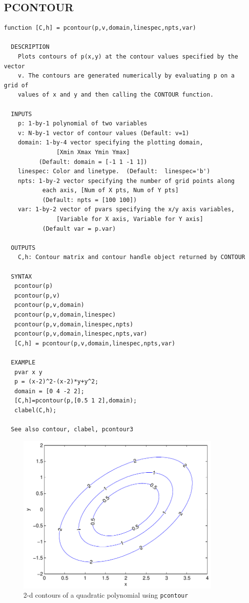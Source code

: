 \documentclass{article}
\begin{document}
\subsection{PCONTOUR}
\begin{verbatim}
function [C,h] = pcontour(p,v,domain,linespec,npts,var)

  DESCRIPTION
    Plots contours of p(x,y) at the contour values specified by the vector
    v. The contours are generated numerically by evaluating p on a grid of
    values of x and y and then calling the CONTOUR function.

  INPUTS
    p: 1-by-1 polynomial of two variables
    v: N-by-1 vector of contour values (Default: v=1)
    domain: 1-by-4 vector specifying the plotting domain,
               [Xmin Xmax Ymin Ymax]
          (Default: domain = [-1 1 -1 1])
    linespec: Color and linetype.  (Default:  linespec='b')
    npts: 1-by-2 vector specifying the number of grid points along
           each axis, [Num of X pts, Num of Y pts]
           (Default: npts = [100 100])
    var: 1-by-2 vector of pvars specifying the x/y axis variables,
               [Variable for X axis, Variable for Y axis]
           (Default var = p.var)

  OUTPUTS
    C,h: Contour matrix and contour handle object returned by CONTOUR

  SYNTAX
   pcontour(p)
   pcontour(p,v)
   pcontour(p,v,domain)
   pcontour(p,v,domain,linespec)
   pcontour(p,v,domain,linespec,npts)
   pcontour(p,v,domain,linespec,npts,var)
   [C,h] = pcontour(p,v,domain,linespec,npts,var)

  EXAMPLE
   pvar x y
   p = (x-2)^2-(x-2)*y+y^2;
   domain = [0 4 -2 2];
   [C,h]=pcontour(p,[0.5 1 2],domain);
   clabel(C,h);

  See also contour, clabel, pcontour3

\end{verbatim}

\newpage
\begin{figure}[h]
\begin{center}
\includegraphics[width=4in]{figs/pcontourPLOT.pdf}
\caption{2-d contours of a quadratic polynomial using \texttt{pcontour}}
\end{center}
\end{figure}
\end{document}
